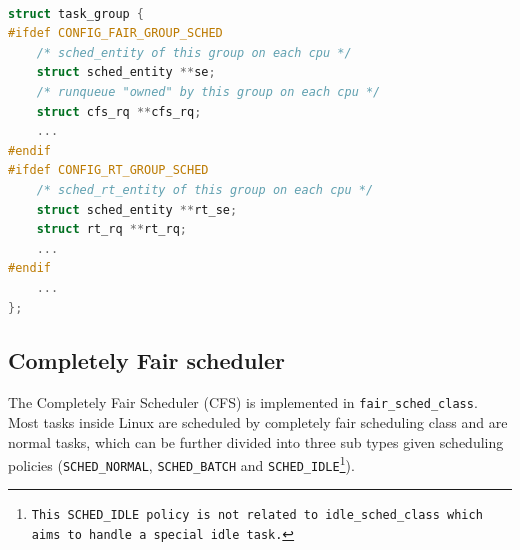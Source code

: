 \begin{lstlisting}[language=C,
caption={\texttt{Specific runqueue information within a task group}},
			label={lst:task_group_ex}]		

struct task_group {
#ifdef CONFIG_FAIR_GROUP_SCHED
	/* sched_entity of this group on each cpu */
	struct sched_entity **se;
	/* runqueue "owned" by this group on each cpu */
	struct cfs_rq **cfs_rq;
	...
#endif
#ifdef CONFIG_RT_GROUP_SCHED
	/* sched_rt_entity of this group on each cpu */
	struct sched_entity **rt_se;
	struct rt_rq **rt_rq;
	...
#endif
	...
};
\end{lstlisting}

\subsection{Completely Fair scheduler\label{sec:LinuxSched_cfs}}

The Completely Fair Scheduler (CFS) is implemented in
\texttt{fair\_sched\_class}.  Most tasks inside Linux are scheduled by
completely fair scheduling class and are normal tasks, which can be
further divided into three sub types given scheduling policies
(\texttt{SCHED\_NORMAL}, \texttt{SCHED\_BATCH} and
\texttt{SCHED\_IDLE\footnote{This SCHED\_IDLE policy is not related to
    idle\_sched\_class which aims to handle a special idle task.}}).

